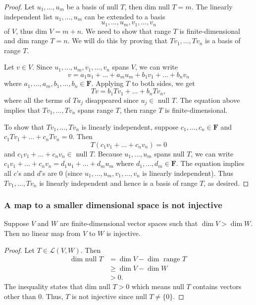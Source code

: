 \documentclass[11pt]{article}
\begin{document}
    \begin{proof}
        Let \(u_1, \dots, u_m\) be a basis of null $T$, then dim null $T = m$. The linearly independent list \(u_1, \dots, u_m\) can be extended to a basis \[u_1, \dots, u_m, v_1, \dots, v_n\] of $V$, thus dim $V = m + n$. We need to show that range $T$ is finite-dimensional and dim range $T = n$. We will do this by proving that \(Tv_1, \dots, Tv_n\) is a basis of range $T$.

        \vspace{1em}

        Let \(v \in V\). Since \(u_1, \dots, u_m, v_1, \dots, v_n\) spans $V$, we can write \[v = a_1 u_1 + \dots + a_m u_m + b_1 v_1 + \dots + b_n v_n\] where \(a_1, \dots, a_m, b_1, \dots, b_n \in \textbf{F}\). Applying $T$ to both sides, we get \[Tv = b_1 Tv_1 + \dots + b_n T v_n,\] where all the terms of \(Tu_j\) disappeared since \(u_j \in \) null $T$. The equation above implies that \(Tv_1, \dots, Tv_n\) spans range $T$, then range $T$ is finite-dimensional. 

        \vspace{1em}
        To show that \(Tv_1, \dots, Tv_n\) is linearly independent, suppose \(c_1, \dots, c_n \in \textbf{F}\) and \(c_1 Tv_1 + \dots + c_n T v_n = 0.\) Then \[T(c_1 v_1 + \dots + c_n v_n) = 0\] and \(c_1 v_1 + \dots + c_n v_n \in \) null $T$. Because \(u_1, \dots, u_m\) spans null $T$, we can write \(c_1 v_1 + \dots + c_n v_n = d_1 u_1 + \dots + d_m u_m\) where \(d_1, \dots, d_m \in \textbf{F}\). The equation implies all $c$'s and $d$'s are 0 (since \(u_1, \dots, u_m, v_1, \dots, v_n\) is linearly independent). Thus \(Tv_1, \dots, Tv_n\) is linearly independent and hence is a basis of range $T$, as desired.
    \end{proof}

    \subsubsection{A map to a smaller dimensional space is not injective}

    Suppose $V$ and $W$ are finite-dimensional vector spaces such that \(\dim V > \dim W\). Then no linear map from $V$ to $W$ is injective. 

    \begin{proof}
        Let \(T \in \mathcal{L}(V,W)\). Then 
        \begin{align*}
            \text{dim null } T &= \dim V - \dim \text{ range } T \\
                               &\geq \dim V - \dim W \\
                               &> 0.
        \end{align*}
        The inequality states that dim null $T > 0$ which means null $T$ contains vectors other than 0. Thus, $T$ is not injective since null $T \neq \{0\}$. 
    \end{proof}
\end{document}
